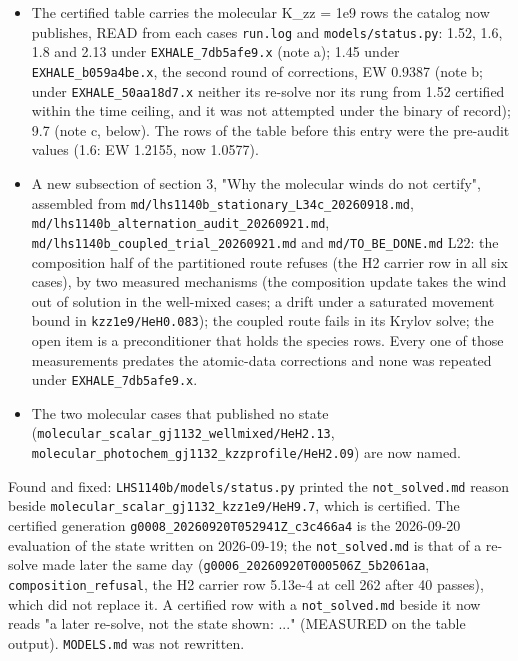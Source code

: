 \documentclass[english,a4paper]{my_memo}
\providecommand{\tightlist}{\setlength{\itemsep}{0pt}\setlength{\parskip}{0pt}}
\begin{document}
\begin{itemize}
\tightlist
\item
  The certified table carries the molecular K\_zz = 1e9 rows the catalog now
  publishes, READ from each case\textquotesingle s \texttt{run.log} and \texttt{models/status.py}: 1.52,
  1.6, 1.8 and 2.13 under \texttt{EXHALE\_7db5afe9.x} (note a); 1.45 under
  \texttt{EXHALE\_b059a4be.x}, the second round of corrections, EW 0.9387 (note b;
  under \texttt{EXHALE\_50aa18d7.x} neither its re-solve nor its rung from 1.52
  certified within the time ceiling, and it was not attempted under the
  binary of record); 9.7 (note c, below). The rows of the table before this
  entry were the pre-audit values (1.6: EW 1.2155, now 1.0577).
\item
  A new subsection of section 3, "Why the molecular winds do not certify",
  assembled from \texttt{md/lhs1140b\_stationary\_L34c\_20260918.md},
  \texttt{md/lhs1140b\_alternation\_audit\_20260921.md},
  \texttt{md/lhs1140b\_coupled\_trial\_20260921.md} and \texttt{md/TO\_BE\_DONE.md} L22: the
  composition half of the partitioned route refuses (the H2 carrier row in
  all six cases), by two measured mechanisms (the composition update takes
  the wind out of solution in the well-mixed cases; a drift under a
  saturated movement bound in \texttt{kzz1e9/HeH0.083}); the coupled route fails
  in its Krylov solve; the open item is a preconditioner that holds the
  species rows. Every one of those measurements predates the atomic-data
  corrections and none was repeated under \texttt{EXHALE\_7db5afe9.x}.
\item
  The two molecular cases that published no state
  (\texttt{molecular\_scalar\_gj1132\_wellmixed/HeH2.13},
  \texttt{molecular\_photochem\_gj1132\_kzzprofile/HeH2.09}) are now named.
\end{itemize}

Found and fixed: \texttt{LHS1140b/models/status.py} printed the \texttt{not\_solved.md}
reason beside \texttt{molecular\_scalar\_gj1132\_kzz1e9/HeH9.7}, which is certified.
The certified generation \texttt{g0008\_20260920T052941Z\_c3c466a4} is the
2026-09-20 evaluation of the state written on 2026-09-19; the
\texttt{not\_solved.md} is that of a re-solve made later the same day
(\texttt{g0006\_20260920T000506Z\_5b2061aa}, \texttt{composition\_refusal}, the H2 carrier
row 5.13e-4 at cell 262 after 40 passes), which did not replace it. A
certified row with a \texttt{not\_solved.md} beside it now reads "a later re-solve,
not the state shown: ..." (MEASURED on the table output). \texttt{MODELS.md} was
not rewritten.
\end{document}
